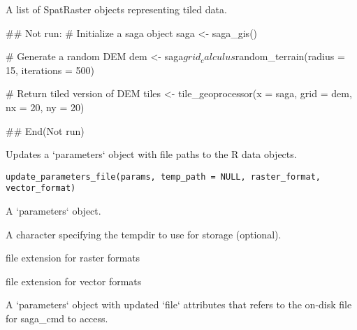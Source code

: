 \documentclass[a4paper]{book}
\begin{document}
%
\begin{Value}
A list of SpatRaster objects representing tiled data.
\end{Value}
%
\begin{Examples}
\begin{ExampleCode}
## Not run: 
# Initialize a saga object
saga <- saga_gis()

# Generate a random DEM
dem <- saga$grid_calculus$random_terrain(radius = 15, iterations = 500)

# Return tiled version of DEM
tiles <- tile_geoprocessor(x = saga, grid = dem, nx = 20, ny = 20)

## End(Not run)
\end{ExampleCode}
\end{Examples}
%
\begin{Description}
Updates a `parameters` object with file paths to the R data objects.
\end{Description}
%
\begin{Usage}
\begin{verbatim}
update_parameters_file(params, temp_path = NULL, raster_format, vector_format)
\end{verbatim}
\end{Usage}
%
\begin{Arguments}
\begin{ldescription}
\item[\code{params}] A `parameters` object.

\item[\code{temp\_path}] A character specifying the tempdir to use for storage
(optional).

\item[\code{raster\_format}] file extension for raster formats

\item[\code{vector\_format}] file extension for vector formats
\end{ldescription}
\end{Arguments}
%
\begin{Value}
A `parameters` object with updated `file` attributes that refers to
the on-disk file for saga\_cmd to access.
\end{Value}
\end{document}
